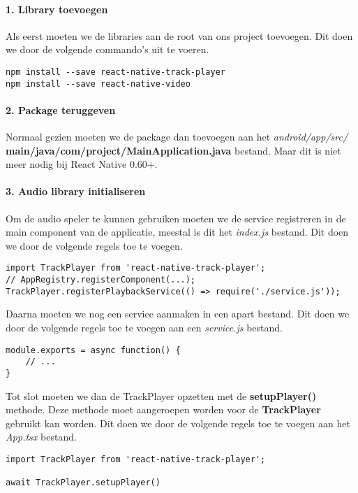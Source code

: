 \paragraph{1. Library toevoegen}
Als eerst moeten we de libraries aan de root van ons project toevoegen. Dit doen we door de 
volgende commando's uit te voeren.
\begin{verbatim}
npm install --save react-native-track-player
npm install --save react-native-video
\end{verbatim}

\paragraph{2. Package teruggeven}
Normaal gezien moeten we de package dan toevoegen aan het 
\textit{android/app/src/} \textbf{main/java/com/project/MainApplication.java} bestand.
Maar dit is niet meer nodig bij React Native 0.60+.

\paragraph{3. Audio library initialiseren}
Om de audio speler te kunnen gebruiken moeten we de service registreren in de main 
component van de applicatie, meestal is dit het \textit{index.js} bestand. Dit doen we door de volgende
regels toe te voegen.
\begin{verbatim}
import TrackPlayer from 'react-native-track-player';
// AppRegistry.registerComponent(...);
TrackPlayer.registerPlaybackService(() => require('./service.js'));
\end{verbatim}
Daarna moeten we nog een service aanmaken in een apart bestand. Dit doen we door de volgende regels
toe te voegen aan een \textit{service.js} bestand. 
\begin{verbatim}
module.exports = async function() {
    // ...
}
\end{verbatim}
Tot slot moeten we dan de TrackPlayer opzetten met de \textbf{setupPlayer()} methode. Deze methode
moet aangeroepen worden voor de \textbf{TrackPlayer} gebruikt kan worden. Dit doen we door de volgende
regels toe te voegen aan het \textit{App.tsx} bestand.
\begin{verbatim}
import TrackPlayer from 'react-native-track-player';

await TrackPlayer.setupPlayer()
\end{verbatim}

